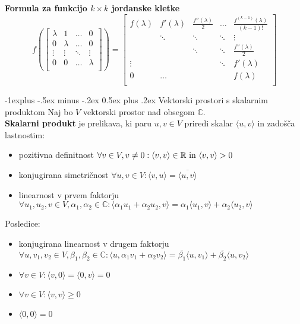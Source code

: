 \documentclass[a4paper,landscape]{article}
\makeatletter
\renewcommand{\subsection}{\@startsection{subsection}{2}{0mm}%
                                {-1explus -.5ex minus -.2ex}%
                                {0.5ex plus .2ex}%
                                {\normalfont\normalsize\bfseries}}
\makeatother
\begin{document}
\begin{multicols}{3}
\textbf{Formula za funkcijo $k \times k$ jordanske kletke}
\[
f(
\begin{bmatrix}
    \lambda & 1   & \dots & 0 \\
    0 & \lambda & \dots & 0 \\
    \vdots & \vdots & \ddots & \vdots \\    
    0 & 0 & \dots & \lambda \\
\end{bmatrix}
)
=
\begin{bmatrix}
    f(\lambda) & f'(\lambda) & \frac{f''(\lambda)}{2} & \dots & \frac{f^{(k-1)}(\lambda)}{(k-1)!} \\
     & \ddots & \ddots & \ddots & \vdots \\
     &  & \ddots & \ddots & \frac{f''(\lambda)}{2} \\
    \vdots &  &  & \ddots & f'(\lambda) \\
    0 & \dots &  &  & f(\lambda) \\
\end{bmatrix}
\]

\subsection{Vektorski prostori s skalarnim produktom}
Naj bo $V$ vektorski prostor nad obsegom $\mathbb{C}$.\\
\textbf{Skalarni produkt} je prelikava, ki paru $u,v\in V$ priredi skalar $\langle u,v\rangle $ in zadošča lastnostim:
\begin{itemize}
    \item pozitivna definitnost $\forall v \in V, v \neq 0 : \langle v,v \rangle \in \mathbb{R}\ \textmd{in} \ \langle v,v\rangle > 0$
    \item konjugirana simetričnost $ \forall u,v \in V : \langle v, u \rangle = \overline{\langle u, v \rangle} $
    \item linearnost v prvem faktorju  $ \forall u_1, u_2, v \in V, \alpha_1, \alpha_2 \in \mathbb{C} : \langle \alpha_1 u_1 + \alpha_2 u_2, v \rangle = \alpha_1 \langle u_1, v \rangle + \alpha_2 \langle u_2, v \rangle $
\end{itemize}
Posledice:
\begin{itemize}
    \item konjugirana linearnost v drugem faktorju $ \forall u, v_1, v_2 \in V, \beta_1, \beta_2 \in \mathbb{C} : \langle u, \alpha_1 v_1 + \alpha_2 v_2 \rangle = \overline{\beta_1} \langle u, v_1 \rangle + \overline{\beta_2} \langle u, v_2 \rangle $
    \item $\forall v \in V : \langle v, 0 \rangle = \langle 0, v \rangle = 0 $
    \item $\forall v \in V : \langle v, v \rangle \geq 0 $
    \item $\langle 0, 0 \rangle = 0 $
\end{itemize}


\end{multicols}
\end{document}
